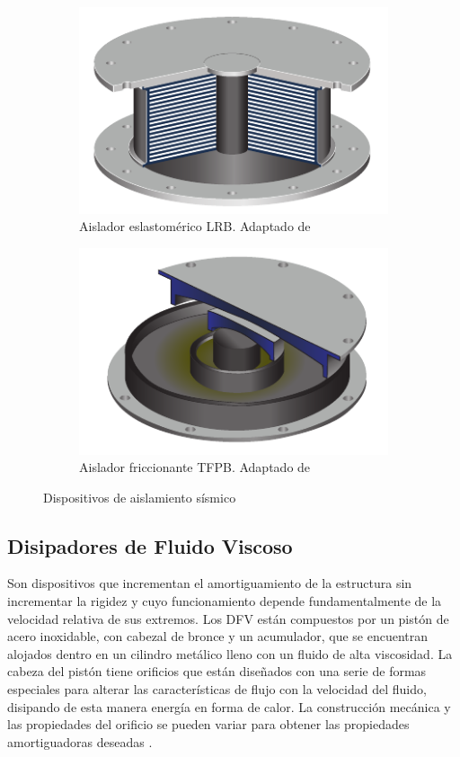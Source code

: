 	\begin{figure}[!h]
	\centering
	\begin{subfigure}[b]{0.45\textwidth}
  	\centering
  	\includegraphics[scale=1]{E_IMAGENES/2_Capitulo2/Cap2_Imagen1a.pdf}
	\caption{\centering\footnotesize Aislador eslastomérico LRB. Adaptado de \citet{Bridgestone2015}}
  	\label{Cap2_Figura1a}
	\end{subfigure}
	\hfill
	\begin{subfigure}[b]{0.45\textwidth}
  	\centering
  	\includegraphics[scale=1]{E_IMAGENES/2_Capitulo2/Cap2_Imagen1b.pdf} 
  	\caption{\centering\footnotesize Aislador friccionante TFPB. Adaptado de \citet{Fenz2008}}
  	\label{Cap2_Figura1b}
	\end{subfigure}
	\caption[Dispositivos de aislamiento sísmico]{\centering\footnotesize Dispositivos de aislamiento sísmico}
	\label{Cap2_Figura1}
	\end{figure}
	
	\subsection{Disipadores de Fluido Viscoso}
Son dispositivos que incrementan el amortiguamiento de la estructura sin incrementar la rigidez y cuyo funcionamiento depende fundamentalmente de la velocidad relativa de sus extremos. Los DFV están compuestos por un pistón de acero inoxidable, con cabezal de bronce y un acumulador, que se encuentran alojados dentro en un cilindro metálico lleno con un fluido de alta viscosidad. La cabeza del pistón tiene orificios que están diseñados con una serie de formas especiales para alterar las características de flujo con la velocidad del fluido, disipando de esta manera energía en forma de calor. La construcción mecánica y las propiedades del orificio se pueden variar para obtener las propiedades amortiguadoras deseadas \citep{Constantinou1993}.

